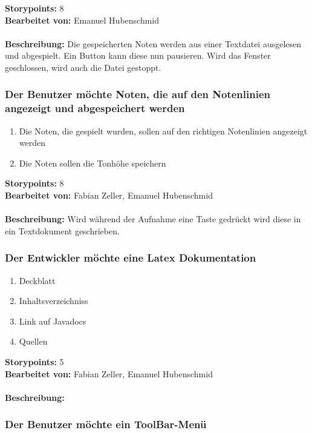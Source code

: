 \textbf{Storypoints:} 8 \\
\textbf{Bearbeitet von:} Emanuel Hubenschmid \\
\\
\textbf{Beschreibung:} Die gespeicherten Noten werden aus einer Textdatei ausgelesen und 
abgespielt. Ein Button kann diese nun pausieren. Wird das Fenster geschlossen, wird auch die Datei 
gestoppt.


\subsubsection{Der Benutzer möchte Noten, die auf den Notenlinien angezeigt und abgespeichert 
werden}

\begin{enumerate}
 \item Die Noten, die gespielt wurden, sollen auf den richtigen Notenlinien angezeigt werden
 \item Die Noten sollen die Tonhöhe speichern
\end{enumerate}

\textbf{Storypoints:} 8 \\
\textbf{Bearbeitet von:} Fabian Zeller, Emanuel Hubenschmid \\
\\
\textbf{Beschreibung:} Wird während der Aufnahme eine Taste gedrückt wird diese in ein Textdokument 
geschrieben.


\subsubsection{Der Entwickler möchte eine Latex Dokumentation}

\begin{enumerate}
 \item Deckblatt
 \item Inhaltsverzeichniss
 \item Link auf Javadocs
 \item Quellen
\end{enumerate}

\textbf{Storypoints:} 5 \\
\textbf{Bearbeitet von:} Fabian Zeller, Emanuel Hubenschmid \\
\\
\textbf{Beschreibung:} 


\subsubsection{Der Benutzer möchte ein ToolBar-Menü}

